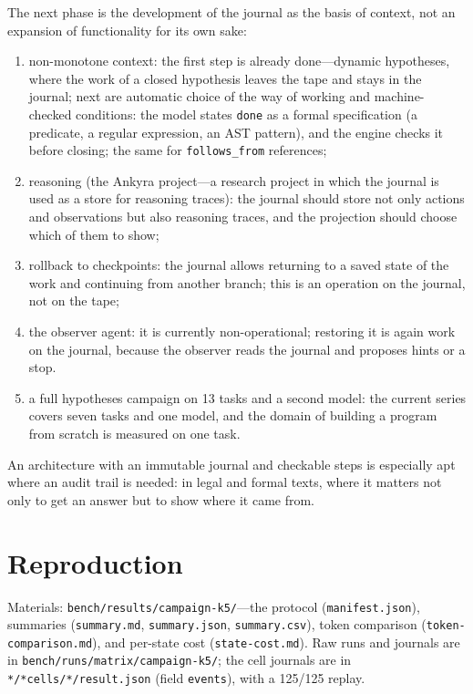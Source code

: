 \documentclass[11pt,a4paper]{article}
\begin{document}
The next phase is the development of the journal as the basis of context, not an expansion of
functionality for its own sake:
\begin{enumerate}[leftmargin=1.4em,itemsep=0.2em]
  \item non-monotone context: the first step is already done---dynamic hypotheses, where the work
  of a closed hypothesis leaves the tape and stays in the journal; next are automatic choice of
  the way of working and machine-checked conditions: the model states \texttt{done} as a formal
  specification (a predicate, a regular expression, an AST pattern), and the engine checks it
  before closing; the same for \texttt{follows\_from} references;
  \item reasoning (the Ankyra project---a research project in which the journal is used as a
  store for reasoning traces): the journal should store not only actions and observations but
  also reasoning traces, and the projection should choose which of them to show;
  \item rollback to checkpoints: the journal allows returning to a saved state of the work and
  continuing from another branch; this is an operation on the journal, not on the tape;
  \item the observer agent: it is currently non-operational; restoring it is again work on the
  journal, because the observer reads the journal and proposes hints or a stop.
  \item a full hypotheses campaign on 13 tasks and a second model: the current series covers seven
  tasks and one model, and the domain of building a program from scratch is measured on one task.
\end{enumerate}

An architecture with an immutable journal and checkable steps is especially apt where an audit
trail is needed: in legal and formal texts, where it matters not only to get an answer but to show
where it came from.

\appendix

\section{Reproduction}

\begin{sloppypar}
Materials: \texttt{bench/results/campaign-k5/}---the protocol (\texttt{manifest.json}), summaries
(\texttt{summary.md}, \texttt{summary.json}, \texttt{summary.csv}), token comparison
(\texttt{token-comparison.md}), and per-state cost (\texttt{state-cost.md}). Raw runs and
journals are in \texttt{bench/runs/matrix/campaign-k5/}; the cell journals are in
\texttt{*/*cells/*/result.json} (field \texttt{events}), with a 125/125 replay.
\end{sloppypar}
\end{document}
